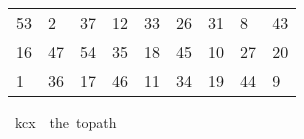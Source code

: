 \begin{isabellebody}
\begin{isamarkuptext}
\begin{table}[H]
\begin{tabular}{lllllllll}
      53 &  2 & 37 & 12 & 33 & 26 & 31 &  8 & 43 \\
      16 & 47 & 54 & 35 & 18 & 45 & 10 & 27 & 20 \\
       1 & 36 & 17 & 46 & 11 & 34 & 19 & 44 &  9
    \end{tabular}
  \end{table}%
\end{isamarkuptext}\isamarkuptrue%
\isamarkupfalse%
\ {\isachardoublequoteopen}kc{}x{}\ {\isasymequiv}\ the\ {\isacharparenleft}{\kern0pt}to{\isacharunderscore}{\kern0pt}path\ \isanewline
\ \ {\isacharbrackleft}{\kern0pt}{\isacharbrackleft}{\kern0pt}{}{}{\isacharcomma}{\kern0pt}{}{}{\isacharcomma}{\kern0pt}{}{\isacharcomma}{\kern0pt}{}{}{\isacharcomma}{\kern0pt}{}{}{\isacharcomma}{\kern0pt}{}{}{\isacharcomma}{\kern0pt}{}{\isacharcomma}{\kern0pt}{}{}{\isacharcomma}{\kern0pt}{}{}{\isacharbrackright}{\kern0pt}{\isacharcomma}{\kern0pt}\isanewline
\ \ {\isacharbrackleft}{\kern0pt}{}{\isacharcomma}{\kern0pt}{}{}{\isacharcomma}{\kern0pt}{}{}{\isacharcomma}{\kern0pt}{}{}{\isacharcomma}{\kern0pt}{}{\isacharcomma}{\kern0pt}{}{}{\isacharcomma}{\kern0pt}{}{}{\isacharcomma}{\kern0pt}{}{}{\isacharcomma}{\kern0pt}{}{\isacharbrackright}{\kern0pt}{\isacharcomma}{\kern0pt}\isanewline
\ \ {\isacharbrackleft}{\kern0pt}{}{}{\isacharcomma}{\kern0pt}{}{}{\isacharcomma}{\kern0pt}{}{}{\isacharcomma}{\kern0pt}{}{}{\isacharcomma}{\kern0pt}{}{}{\isacharcomma}{\kern0pt}{}{}{\isacharcomma}{\kern0pt}{}{}{\isacharcomma}{\kern0pt}{}{}{\isacharcomma}{\kern0pt}{}{}{\isacharbrackright}{\kern0pt}{\isacharcomma}{\kern0pt}\isanewline
\ \ {\isacharbrackleft}{\kern0pt}{}{}{\isacharcomma}{\kern0pt}{}{\isacharcomma}{\kern0pt}{}{}{\isacharcomma}{\kern0pt}{}{}{\isacharcomma}{\kern0pt}{}{}{\isacharcomma}{\kern0pt}{}{}{\isacharcomma}{\kern0pt}{}{}{\isacharcomma}{\kern0pt}{}{\isacharcomma}{\kern0pt}{}{}{\isacharbrackright}{\kern0pt}{\isacharcomma}{\kern0pt}\isanewline

\end{isabellebody}
